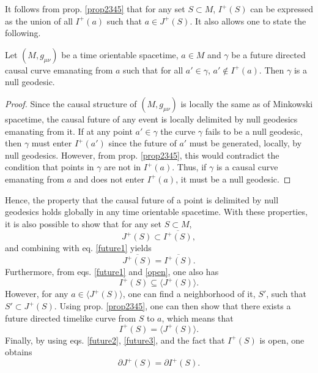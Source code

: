 \documentclass[
12pt,		%
openright,	%
twoside,  %
a4paper,			%
chapter=TITLE,		%
english,			%
french,				%
spanish,			%
brazil				%
]{USPSC-classe/USPSC}
\begin{document}
It follows from prop. \ref{prop2345} that for any set $S\subset M$, $I^+(S)$ can be expressed as the union of all $I^+(a)$ such that $a\in J^+(S)$. It also allows one to state the following.
\begin{proposition}\label{prop23456}
    Let $(M,g_{\mu\nu})$ be a time orientable spacetime, $a\in M$ and $\gamma$ be a future directed causal curve emanating from $a$ such that for all $a'\in\gamma$, $a'\not\in I^+(a)$. Then $\gamma$ is a null geodesic.
\end{proposition}
\begin{proof}
    Since the causal structure of $(M,g_{\mu\nu})$ is locally the same as of Minkowski spacetime, the causal future of any event is locally delimited by null geodesics emanating from it. If at any point $a'\in\gamma$ the curve $\gamma$ fails to be a null geodesic, then $\gamma$ must enter $I^+(a')$ since the future of $a'$ must be generated, locally, by null geodesics. However, from prop. \ref{prop2345}, this would contradict the condition that points in $\gamma$ are not in $I^+(a)$. Thus, if $\gamma$ is a causal curve emanating from $a$ and does not enter $I^+(a)$, it must be a null geodesic.
\end{proof}
Hence, the property that the causal future of a point is delimited by null geodesics holds globally in any time orientable spacetime. With these properties, it is also possible to show \cite{Penrose1972} that for any set $S\subset M$,
\begin{equation}
    J^+(S)\subset\overline{I^+(S)},
\end{equation}
and combining with eq. \ref{future1} yields
\begin{equation}\label{future2}
    \overline{J^+(S)}=\overline{I^+(S)}.
\end{equation}
Furthermore, from eqs. \ref{future1} and \ref{open}, one also has
\begin{equation}
    I^+(S)\subseteq\langle J^+(S)\rangle.
\end{equation}
However, for any $a\in\langle J^+(S)\rangle$, one can find a neighborhood of it, $S'$, such that $S'\subset J^+(S)$. Using prop. \ref{prop2345}, one can then show that there exists a future directed timelike curve from $S$ to $a$, which means that
\begin{equation}\label{future3}
    I^+(S)=\langle J^+(S)\rangle.
\end{equation}
Finally, by using eqs. \ref{future2}, \ref{future3}, and the fact that $I^+(S)$ is open, one obtains
\begin{equation}\label{future4}
    \partial J^+(S)= \partial I^+(S).
\end{equation}
\end{document}
